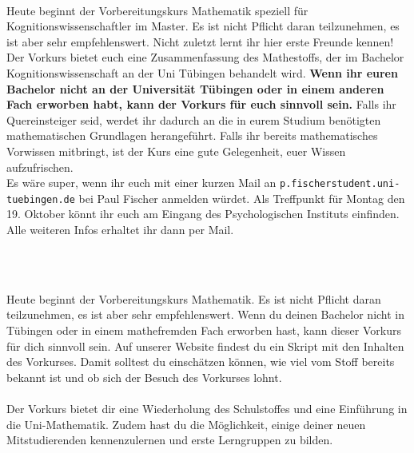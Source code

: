 \begin{description}


\ifkogwiss
    \ifmaster
        \item[Montag, 19. Oktober \YEAR, 08:00 Uhr, Ort Psychologisches Institut 4.332 und 4.326]\ \\
        Heute beginnt der Vorbereitungskurs Mathematik speziell für Kognitionswissenschaftler im Master. Es ist nicht Pflicht daran teilzunehmen, es ist aber sehr empfehlenswert. Nicht zuletzt lernt ihr hier erste Freunde kennen! Der Vorkurs bietet euch eine Zusammenfassung des Mathestoffs, der im Bachelor Kognitionswissenschaft an der Uni Tübingen behandelt wird.
        \textbf{Wenn ihr euren Bachelor nicht an der Universität Tübingen oder in einem anderen Fach erworben habt, kann der Vorkurs für euch sinnvoll sein.} Falls ihr Quereinsteiger seid, werdet ihr dadurch an die in eurem Studium benötigten mathematischen Grundlagen herangeführt. Falls ihr bereits mathematisches Vorwissen mitbringt, ist der Kurs eine gute Gelegenheit, euer Wissen aufzufrischen.\\
         Es wäre super, wenn ihr euch mit einer kurzen Mail an \texttt{p.fischer\At student.uni-tuebingen.de} bei Paul Fischer anmelden würdet. Als Treffpunkt für Montag den 19. Oktober könnt ihr euch am Eingang des Psychologischen Instituts einfinden. Alle weiteren Infos erhaltet ihr dann per Mail.\\

%
%
    \fi
\fi

\ifml
	\item~ %
\else
    \item[Mathevorkurs - \mathedatum~\YEAR]~\\
    \ifbachelor
    Heute beginnt der Vorbereitungskurs Mathematik. Es ist nicht Pflicht daran teilzunehmen, es ist aber sehr empfehlenswert.
    \fi
    \ifmaster
    Wenn du deinen Bachelor nicht in Tübingen oder in einem mathefremden Fach erworben hast, kann dieser Vorkurs für dich sinnvoll sein. Auf unserer Website findest du ein Skript mit den Inhalten des Vorkurses. Damit solltest du einschätzen können, wie viel vom Stoff bereits bekannt ist und ob sich der Besuch des Vorkurses lohnt.\\\\
    \fi
	Der Vorkurs bietet dir eine Wiederholung des Schulstoffes und eine Einführung in die Uni-Mathematik. Zudem hast du die Möglichkeit, einige deiner neuen Mitstudierenden kennenzulernen und erste Lerngruppen zu bilden.
	

\end{description}
